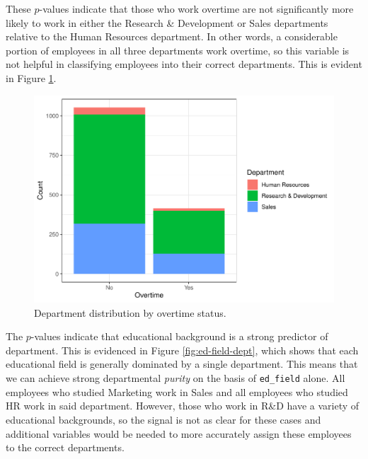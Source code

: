 \documentclass[
]{book}
\begin{document}
These \(p\)-values indicate that those who work overtime are not significantly more likely to work in either the Research \& Development or Sales departments relative to the Human Resources department. In other words, a considerable portion of employees in all three departments work overtime, so this variable is not helpful in classifying employees into their correct departments. This is evident in Figure \ref{fig:ot-dept}.

\begin{figure}

{\centering \includegraphics[width=1\linewidth]{People_Analytics_Lifecycle_files/figure-latex/ot-dept-1} 

}

\caption{Department distribution by overtime status.}\label{fig:ot-dept}
\end{figure}

The \(p\)-values indicate that educational background is a strong predictor of department. This is evidenced in Figure \ref{fig:ed-field-dept}, which shows that each educational field is generally dominated by a single department. This means that we can achieve strong departmental \emph{purity} on the basis of \texttt{ed\_field} alone. All employees who studied Marketing work in Sales and all employees who studied HR work in said department. However, those who work in R\&D have a variety of educational backgrounds, so the signal is not as clear for these cases and additional variables would be needed to more accurately assign these employees to the correct departments.
\end{document}
